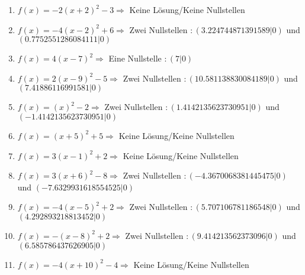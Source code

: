 \documentclass{article}%
\begin{document}
\begin{enumerate}[label=\alph*)]
\item%
\newline\vspace{0.5cm}$f(x)=-2(x+2)^2 -3 \Rightarrow  $ Keine Lösung/Keine Nullstellen $ $%
\item%
\newline\vspace{0.5cm}$f(x)=-4(x-2)^2 +6 \Rightarrow $ Zwei Nullstellen $: (3.224744871391589|0) $ und $ (0.7752551286084111|0) $%
\item%
\newline\vspace{0.5cm}$f(x)=4(x-7)^2 \Rightarrow $ Eine Nullstelle $: (7|0) $%
\item%
\newline\vspace{0.5cm}$f(x)=2(x-9)^2 -5 \Rightarrow $ Zwei Nullstellen $: (10.581138830084189|0) $ und $ (7.41886116991581|0) $%
\item%
\newline\vspace{0.5cm}$f(x)=(x)^2 -2 \Rightarrow $ Zwei Nullstellen $: (1.4142135623730951|0) $ und $ (-1.4142135623730951|0) $%
\item%
\newline\vspace{0.5cm}$f(x)=(x+5)^2 +5 \Rightarrow  $ Keine Lösung/Keine Nullstellen $ $%
\item%
\newline\vspace{0.5cm}$f(x)=3(x-1)^2 +2 \Rightarrow  $ Keine Lösung/Keine Nullstellen $ $%
\item%
\newline\vspace{0.5cm}$f(x)=3(x+6)^2 -8 \Rightarrow $ Zwei Nullstellen $: (-4.3670068381445475|0) $ und $ (-7.6329931618554525|0) $%
\item%
\newline\vspace{0.5cm}$f(x)=-4(x-5)^2 +2 \Rightarrow $ Zwei Nullstellen $: (5.707106781186548|0) $ und $ (4.292893218813452|0) $%
\item%
\newline\vspace{0.5cm}$f(x)=-(x-8)^2 +2 \Rightarrow $ Zwei Nullstellen $: (9.414213562373096|0) $ und $ (6.585786437626905|0) $%
\item%
\newline\vspace{0.5cm}$f(x)=-4(x+10)^2 -4 \Rightarrow  $ Keine Lösung/Keine Nullstellen $ $%

\end{enumerate}
\end{document}
